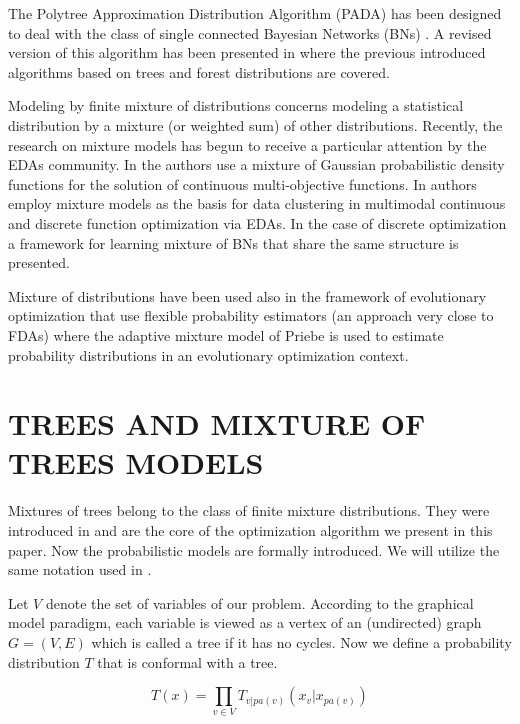 \documentclass[10pt,thmsa]{article}
\begin{document}
The Polytree Approximation Distribution Algorithm (PADA) has been designed
to deal with the class of single connected Bayesian Networks (BNs) %
\citep{Soto_et_al:1999}. A revised version of this algorithm has been
presented in \citep{Ochoa_et_al:2000} where the previous introduced
algorithms based on trees and forest distributions are covered.

Modeling by finite mixture of distributions \citep{Everitt_and_Hand:1981}
concerns modeling a statistical distribution by a mixture (or weighted sum)
of other distributions. Recently, the research on mixture models has begun
to receive a particular attention by the EDAs community. In %
\citep{Thierens_and_Bosman:2001} the authors use a mixture of Gaussian
probabilistic density functions for the solution of continuous
multi-objective functions. In \citep{Penha_et_al:2001} authors employ
mixture models as the basis for data clustering in multimodal continuous and
discrete function optimization via EDAs. In the case of discrete
optimization a framework for learning mixture of BNs that share the same
structure is presented.

Mixture of distributions have been used also in the framework of
evolutionary optimization that use flexible probability estimators %
\citep{Gallagher_et_al:1999} (an approach very close to FDAs) where the
adaptive mixture model of Priebe is used to estimate probability
distributions in an evolutionary optimization context.

\section{TREES AND MIXTURE OF TREES MODELS}

Mixtures of trees belong to the class of finite mixture distributions. They
were introduced in \citep{Meila:1999} and are the core of the optimization
algorithm we present in this paper. Now the probabilistic models are
formally introduced. We will utilize the same notation used in %
\citep{Meila:1999}.

Let $V$ denote the set of variables of our problem. According to the
graphical model paradigm, each variable is viewed as a vertex of an
(undirected) graph $G=(V,E)$ which is called a tree if it has no cycles. Now
we define a probability distribution $T$ that is conformal with a tree.

\begin{equation}
T(x)=\prod_{v\in V}T_{v|pa(v)}(x_v|x_{pa(v)})  \label{T-Tree}
\end{equation}
\end{document}
